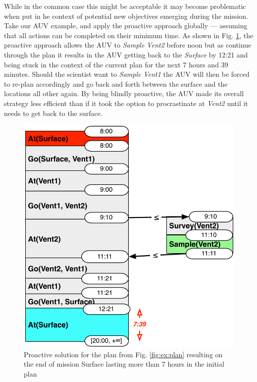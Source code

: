
While in the common case this might be acceptable it
may become problematic when put in he context of potential new
objectives emerging during the mission.  Take our AUV example,
and apply the proactive approach globally --- assuming that all actions
can be completed on their minimum time.  As shown in 
Fig. \ref{fig:ex:proactive}, the proactive approach allows the
AUV to {\em Sample Vent2} before noon but as continue through
the plan it results in the AUV getting back to the {\em Surface}
by 12:21 and being stuck in the context of the current plan for the
next 7 hours and 39 minutes. Should the scientist want to {\em Sample Vent1}
the AUV will then be forced to re-plan accordingly and
go back and forth between the surface and the locations all other
again. By being blindly proactive, the AUV made its overall strategy
less efficient than if it took the option to procrastinate at {\em Vent2}
until it needs to get back to the surface. 


\begin{figure}
  \centering
  \includegraphics[width=0.65\columnwidth]{figs/example_early}
  \caption{Proactive solution for the plan from
    Fig. \ref{fig:ex:plan} resulting on the end of mission 
    Surface lasting more than 7 hours in the initial plan}
  \label{fig:ex:proactive}
\end{figure}


